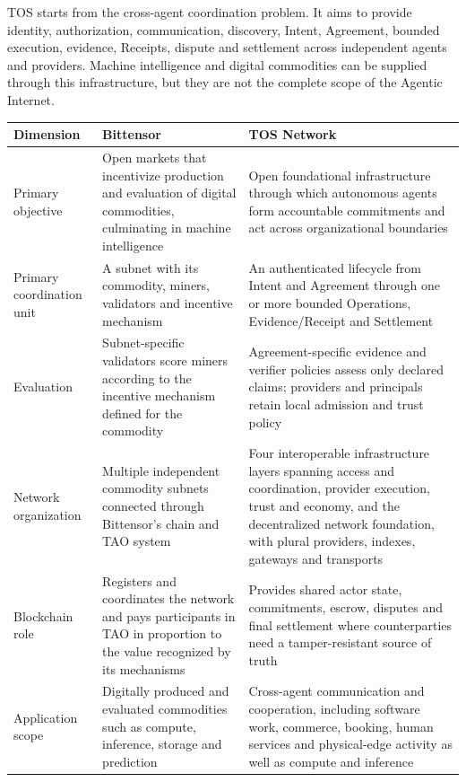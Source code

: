 \documentclass[11pt,oneside]{article}
\begin{document}
TOS starts from the cross-agent coordination problem. It aims to provide identity,
authorization, communication, discovery, Intent, Agreement, bounded execution, evidence,
Receipts, dispute and settlement across independent agents and providers. Machine
intelligence and digital commodities can be supplied through this infrastructure, but they
are not the complete scope of the Agentic Internet.

\begin{longtable}{L{0.19\textwidth}L{0.34\textwidth}L{0.36\textwidth}}
\toprule
Dimension & Bittensor & TOS Network \\
\midrule
\endhead
Primary objective &
Open markets that incentivize production and evaluation of digital commodities, culminating
in machine intelligence &
Open foundational infrastructure through which autonomous agents form accountable
commitments and act across organizational boundaries \\
Primary coordination unit &
A subnet with its commodity, miners, validators and incentive mechanism &
An authenticated lifecycle from Intent and Agreement through one or more bounded Operations,
Evidence/Receipt and Settlement \\
Evaluation &
Subnet-specific validators score miners according to the incentive mechanism defined for the
commodity &
Agreement-specific evidence and verifier policies assess only declared claims; providers and
principals retain local admission and trust policy \\
Network organization &
Multiple independent commodity subnets connected through Bittensor's chain and TAO system &
Four interoperable infrastructure layers spanning access and coordination, provider execution,
trust and economy, and the decentralized network foundation, with plural providers, indexes,
gateways and transports \\
Blockchain role &
Registers and coordinates the network and pays participants in TAO in proportion to the value
recognized by its mechanisms &
Provides shared actor state, commitments, escrow, disputes and final settlement where
counterparties need a tamper-resistant source of truth \\
Application scope &
Digitally produced and evaluated commodities such as compute, inference, storage and
prediction &
Cross-agent communication and cooperation, including software work, commerce, booking,
human services and physical-edge activity as well as compute and inference \\
\bottomrule
\end{longtable}
\end{document}
